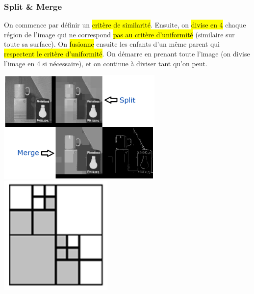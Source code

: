 \documentclass[letterpaper, 12pt]{article}
\newcommand{\alinea}{
\hspace*{0.5cm}}
\begin{document}
		\subsubsection{Split \& Merge}
			\alinea On commence par définir un \hl{critère de similarité}. Ensuite, on \hl{divise en 4} chaque région de l'image qui 
				ne correspond \hl{pas au critère d'uniformité} (similaire sur toute sa surface). On \hl{fusionne} ensuite les 
				enfants d'un même parent qui \hl{respectent le critère d'uniformité}. On démarre en prenant toute l'image 
				(on divise l'image en 4 si nécessaire), et on continue à diviser tant qu'on peut.
			\begin{center}
				\includegraphics[width=3.2in]{Images/split} \hfill \includegraphics[width=2.2in]{Images/split2}
			\end{center}
\end{document}
